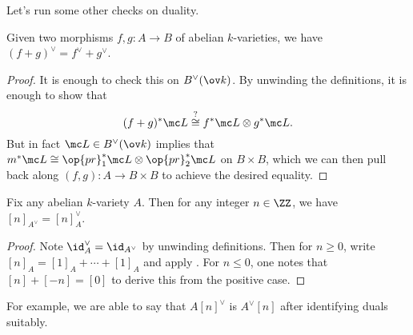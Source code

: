 \documentclass[../notes.tex]{subfiles}
\begin{document}
Let's run some other checks on duality.
\begin{proposition} \label{prop:add-duals}
	Given two morphisms $f,g\colon A\to B$ of abelian $k$-varieties, we have $(f+g)^\lor=f^\lor+g^\lor$.
\end{proposition}
\begin{proof}
	It is enough to check this on $B^\lor(\ov k)$. By unwinding the definitions, it is enough to show that
	\[(f+g)^*\mc L\stackrel?\cong f^*\mc L\otimes g^*\mc L.\]
	But in fact $\mc L\in B^\lor(\ov k)$ implies that $m^*\mc L\cong\op{pr}_1^*\mc L\otimes\op{pr}_2^*\mc L$ on $B\times B$, which we can then pull back along $(f,g)\colon A\to B\times B$ to achieve the desired equality.
\end{proof}
\begin{corollary}
	Fix any abelian $k$-variety $A$. Then for any integer $n\in\ZZ$, we have $[n]_{A^\lor}=[n]_A^\lor$.
\end{corollary}
\begin{proof}
	Note ${\id_A^\lor}=\id_{A^\lor}$ by unwinding definitions. Then for $n\ge0$, write $[n]_A=[1]_A+\cdots+[1]_A$ and apply . For $n\le0$, one notes that $[n]+[-n]=[0]$ to derive this from the positive case.
\end{proof}
\begin{remark}
	For example, we are able to say that $A[n]^\lor$ is $A^\lor[n]$ after identifying duals suitably.
\end{remark}
\end{document}
